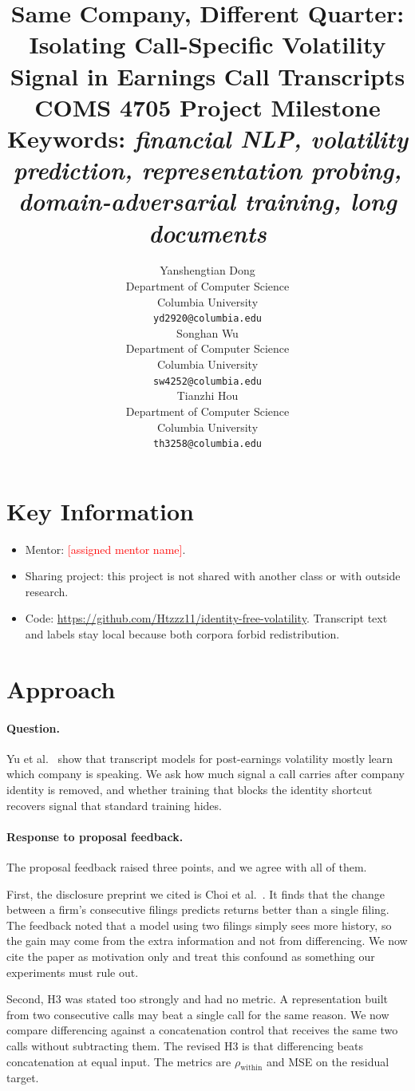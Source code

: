 \documentclass{article}
\title{
Same Company, Different Quarter: Isolating Call-Specific Volatility Signal in Earnings Call Transcripts \\
\vspace{1em}
\small{\normalfont COMS 4705 Project Milestone} \\
\small{\normalfont \textbf{Keywords:} \textit{financial NLP, volatility prediction, representation probing, domain-adversarial training, long documents}}
}
\author{
Yanshengtian Dong \\
Department of Computer Science \\
Columbia University \\
\texttt{yd2920@columbia.edu} \\
\And
Songhan Wu \\
Department of Computer Science \\
Columbia University \\
\texttt{sw4252@columbia.edu} \\
\And
Tianzhi Hou \\
Department of Computer Science \\
Columbia University \\
\texttt{th3258@columbia.edu}
}
\newcommand{\todo}[1]{\textcolor{red}{[#1]}}
\begin{document}
\maketitle

\section{Key Information}

\begin{itemize}
\item Mentor: \todo{assigned mentor name}.
\item Sharing project: this project is not shared with another class or with outside research.
\item Code: \url{https://github.com/Htzzz11/identity-free-volatility}. Transcript text and labels stay local because both corpora forbid redistribution.
\end{itemize}

\section{Approach}

\paragraph{Question.}
Yu et al.\ \cite{yu-etal-2025-company} show that transcript models for post-earnings volatility mostly learn which company is speaking. We ask how much signal a call carries after company identity is removed, and whether training that blocks the identity shortcut recovers signal that standard training hides.

\paragraph{Response to proposal feedback.}
The proposal feedback raised three points, and we agree with all of them.

First, the disclosure preprint we cited is Choi et al.\ \cite{choi2025texttoalpha}. It finds that the change between a firm's consecutive filings predicts returns better than a single filing. The feedback noted that a model using two filings simply sees more history, so the gain may come from the extra information and not from differencing. We now cite the paper as motivation only and treat this confound as something our experiments must rule out.

Second, H3 was stated too strongly and had no metric. A representation built from two consecutive calls may beat a single call for the same reason. We now compare differencing against a concatenation control that receives the same two calls without subtracting them. The revised H3 is that differencing beats concatenation at equal input. The metrics are $\rho_{\text{within}}$ and MSE on the residual target.
\end{document}
